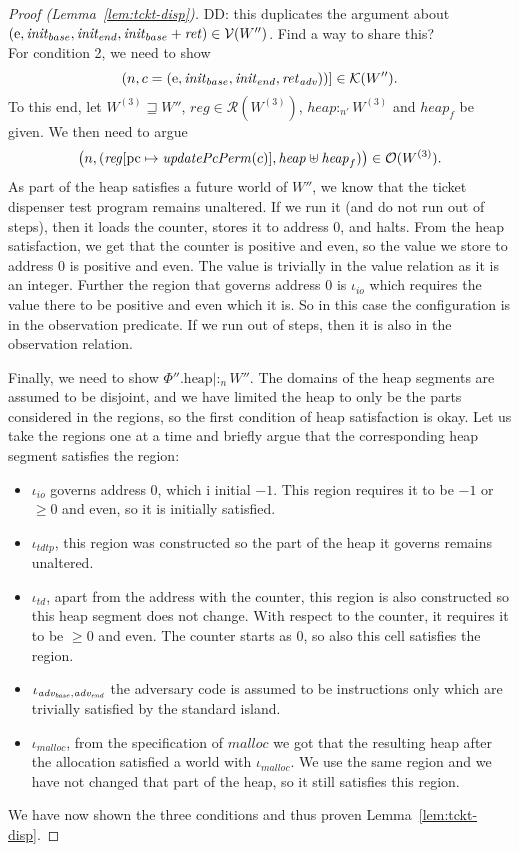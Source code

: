 \documentclass{article}
\newcommand{\update}[2]{[#1 \mapsto #2]}
\newcommand\dominique[1]{{\color{purple} \sf \footnotesize {DD: #1}}\\}
\newcommand{\var}[1]{\mathit{#1}}
\newcommand{\pcreg}{\mathrm{pc}}
\newcommand{\reg}{\var{reg}}
\newcommand{\heap}{\var{heap}}
\newcommand{\plainproj}[1]{\mathrm{#1}}
\newcommand{\memheap}[1][\Phi]{#1.\plainproj{heap}}
\newcommand{\plainfun}[2]{
  \ifthenelse{\equal{#2}{}}
             {\mathit{#1}}
             {\mathit{#1}(#2)}
}
\newcommand{\updatePcPerm}[1]{\plainfun{updatePcPerm}{#1}}
\newcommand{\future}{\mathbin{\sqsupseteq}}
\newcommand{\heapSat}[3][\heap]{#1 :_{#2} #3}
\newcommand{\codelabel}[1]{\mathit{#1}}
\newcommand{\malloc}{\codelabel{malloc}}
\newcommand{\asmType}{\plaindom{AsmType}}
\newcommand{\plaindom}[1]{\mathrm{#1}}
\newcommand{\intr}[2]{\mathcal{#1}}
\newcommand{\valueintr}[1]{\intr{V}{#1}}
\newcommand{\contintr}[1]{\intr{K}{#1}}
\newcommand{\regintr}[1]{\intr{R}{#1}}
\newcommand{\stdvr}{\valueintr{\asmType}}
\newcommand{\stdrr}{\regintr{\asmType}}
\newcommand{\stdkr}{\contintr{\asmType}}
\newcommand{\observations}{\mathcal{O}}
\newcommand{\npair}[2][n]{\left(#1,#2 \right)}
\newcommand{\plainperm}[1]{\mathrm{#1}}
\newcommand{\entry}{\plainperm{e}}
\begin{document}
\begin{proof}[Proof (Lemma~\ref{lem:tckt-disp})]
\dominique{this duplicates the argument about $(\entry,\initb,\inite,\initb+\var{ret}) \in \stdvr(W'')$. Find a way to share this?}
For condition 2, we need to show 
\[
\npair{c = (\entry, \initb, \inite,\reta)}] \in \stdkr(W'').
\]
To this end, let $W^{(3)} \future W''$, $\reg \in \stdrr(W^{(3)})$, $\heapSat[\heap]{n'}{W^{(3)}}$ and $\heap_f$ be given. We then need to argue 
\[
\npair{(\reg\update{\pcreg}{\updatePcPerm{c}},\heap \uplus \heap_f)} \in \observations(W^{(3)}).
\]
As part of the heap satisfies a future world of $W''$, we know that the ticket dispenser test program remains unaltered. If we run it (and do not run out of steps), then it loads the counter, stores it to address $0$, and halts. From the heap satisfaction, we get that the counter is positive and even, so the value we store to address 0 is positive and even. The value is trivially in the value relation as it is an integer. Further the region that governs address 0 is $\iota_{\var{io}}$ which requires the value there to be positive and even which it is. So in this case the configuration is in the observation predicate. If we run out of steps, then it is also in the observation relation.

Finally, we need to show $\heapSat[{\memheap[\Phi'']}|]{n}{W''}$. The domains of the heap segments are assumed to be disjoint, and we have limited the heap to only be the parts considered in the regions, so the first condition of heap satisfaction is okay. Let us take the regions one at a time and briefly argue that the corresponding heap segment satisfies the region:
\begin{itemize}
\item $\iota_{\var{io}}$ governs address 0, which i initial $-1$. This region requires it to be $-1$ or $\geq 0$ and even, so it is initially satisfied.
\item $\iota_{\var{tdtp}}$, this region was constructed so the part of the heap it governs remains unaltered.
\item $\iota_{\var{td}}$, apart from the address with the counter, this region is also constructed so this heap segment does not change. With respect to the counter, it requires it to be $\geq 0$ and even. The counter starts as 0, so also this cell satisfies the region.
\item $\iota_{\advb,\adve}$ the adversary code is assumed to be instructions only which are trivially satisfied by the standard island.
\item $\iota_{\malloc}$, from the specification of $\malloc$ we got that the resulting heap after the allocation satisfied a world with $\iota_{\malloc}$. We use the same region and we have not changed that part of the heap, so it still satisfies this region.
\end{itemize}

We have now shown the three conditions and thus proven Lemma~\ref{lem:tckt-disp}.
\end{proof}
\end{document}

